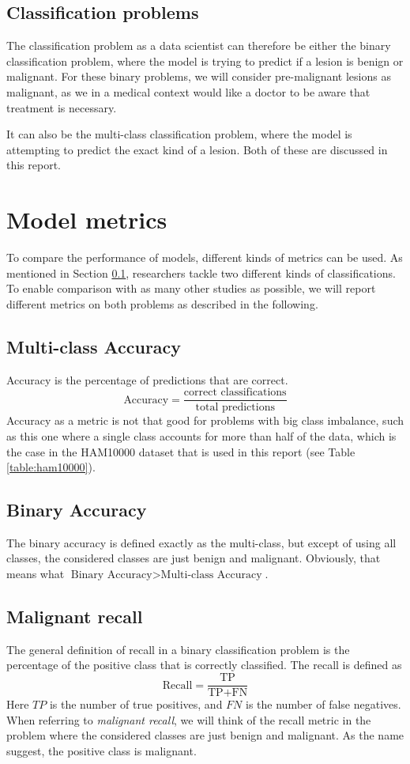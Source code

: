 \subsection{Classification problems}\label{sec:classification-problems}
The classification problem as a data scientist can therefore be either the binary classification problem,
where the model is trying to predict if a lesion is benign or malignant.
For these binary problems, we will consider pre-malignant lesions as malignant,
as we in a medical context would like a doctor to be aware that treatment is necessary.

It can also be the multi-class classification problem,
where the model is attempting to predict the exact kind of a lesion.
Both of these are discussed in this report.

\section{Model metrics} \label{sec:model_metrics}
To compare the performance of models, different kinds of metrics can be used.
As mentioned in Section \ref{sec:classification-problems},
researchers tackle two different kinds of classifications.
To enable comparison with as many other studies as possible,
we will report different metrics
on both problems as described in the following.

\subsection{Multi-class Accuracy}
Accuracy is the percentage of predictions that are correct.
\[
    \text{Accuracy} = \frac{\text{correct classifications}}{\text{total predictions}}
\]
Accuracy as a metric is not that good for problems with big class imbalance,
such as this one where a single class accounts for more than half of the data,
which is the case in the HAM10000 dataset that is used in this report (see Table \ref{table:ham10000}).

\subsection{Binary Accuracy}
The binary accuracy is defined exactly as the multi-class, but except of using all classes,
the considered classes are just benign and malignant.
Obviously, that means what $\text{Binary Accuracy} > \text{Multi-class Accuracy}$.

\subsection{Malignant recall}
The general definition of recall in a binary classification problem is the percentage of the positive class
that is correctly classified.
The recall is defined as
\[
    \text{Recall} = \frac{\text{TP}}{\text{TP} + \text{FN}}
\]
Here $TP$ is the number of true positives, and $FN$ is the number of false negatives.
When referring to \textit{malignant recall}, we will think of the recall metric in the problem
where the considered classes are just benign and malignant.
As the name suggest, the positive class is malignant.

